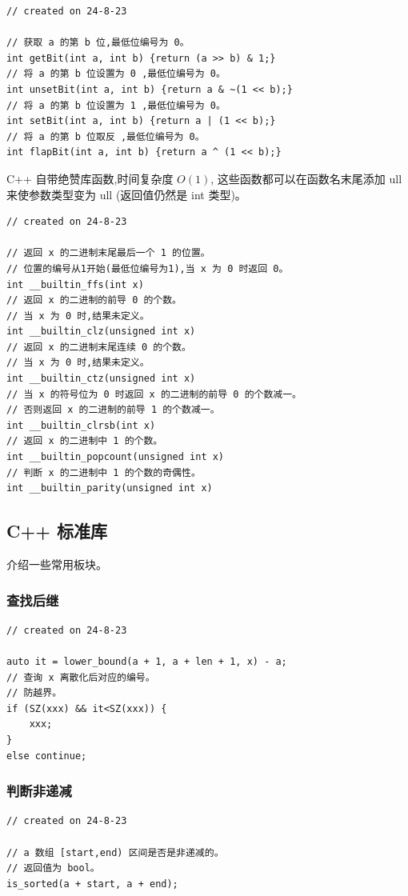\documentclass[a4paper,12pt]{article}
\begin{document}
\begin{lstlisting}
// created on 24-8-23

// 获取 a 的第 b 位,最低位编号为 0。
int getBit(int a, int b) {return (a >> b) & 1;}
// 将 a 的第 b 位设置为 0 ,最低位编号为 0。
int unsetBit(int a, int b) {return a & ~(1 << b);}
// 将 a 的第 b 位设置为 1 ,最低位编号为 0。
int setBit(int a, int b) {return a | (1 << b);}
// 将 a 的第 b 位取反 ,最低位编号为 0。
int flapBit(int a, int b) {return a ^ (1 << b);}
\end{lstlisting} 

\noindent C++ 自带绝赞库函数,时间复杂度 $O(1)$,
这些函数都可以在函数名末尾添加 ull 来使参数类型变为 ull (返回值仍然是 int 类型)。
\begin{lstlisting}
// created on 24-8-23

// 返回 x 的二进制末尾最后一个 1 的位置。
// 位置的编号从1开始(最低位编号为1),当 x 为 0 时返回 0。
int __builtin_ffs(int x)
// 返回 x 的二进制的前导 0 的个数。
// 当 x 为 0 时,结果未定义。
int __builtin_clz(unsigned int x)
// 返回 x 的二进制末尾连续 0 的个数。
// 当 x 为 0 时,结果未定义。
int __builtin_ctz(unsigned int x)
// 当 x 的符号位为 0 时返回 x 的二进制的前导 0 的个数减一。
// 否则返回 x 的二进制的前导 1 的个数减一。
int __builtin_clrsb(int x)
// 返回 x 的二进制中 1 的个数。
int __builtin_popcount(unsigned int x)
// 判断 x 的二进制中 1 的个数的奇偶性。
int __builtin_parity(unsigned int x)
\end{lstlisting}

\subsection{C++ 标准库}
\noindent 介绍一些常用板块。

\subsubsection{查找后继}
\begin{lstlisting}
// created on 24-8-23

auto it = lower_bound(a + 1, a + len + 1, x) - a;
// 查询 x 离散化后对应的编号。
// 防越界。
if (SZ(xxx) && it<SZ(xxx)) {
    xxx;
}
else continue;
\end{lstlisting}

\subsubsection{判断非递减}
\begin{lstlisting}
// created on 24-8-23

// a 数组 [start,end) 区间是否是非递减的。
// 返回值为 bool。
is_sorted(a + start, a + end);
\end{lstlisting}
\end{document}
